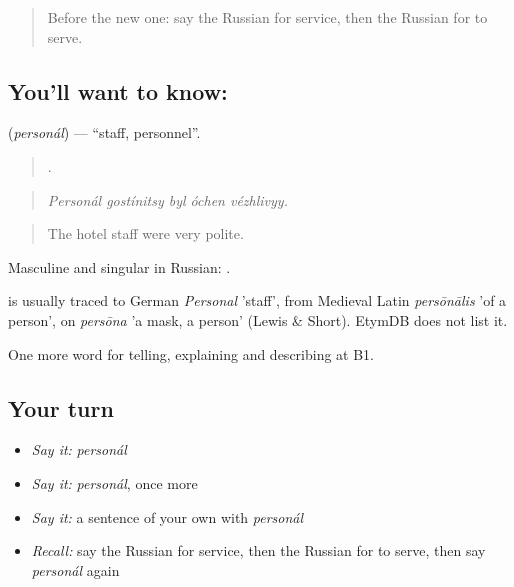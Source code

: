 \label{lesson:RU-C435-personal}



\begin{quote}
Before the new one: say the Russian for service, then the Russian for to serve.
\end{quote}

\subsection*{You'll want to know: }
\textbf{} (\emph{personál}) — \textquotedblleft{}staff, personnel\textquotedblright{}.

\begin{quote}
    .
\end{quote}

\begin{quote}
\emph{Personál gostínitsy byl óchen vézhlivyy.}
\end{quote}

\begin{quote}
The hotel staff were very polite.
\end{quote}

Masculine and singular in Russian: \emph{ }.

\begin{cousinweb}
\emph{} is usually traced to German \emph{Personal} 'staff', from Medieval Latin \emph{persōnālis} 'of a person', on \emph{persōna} 'a mask, a person' (Lewis \& Short). EtymDB does not list it.
\end{cousinweb}

\begin{grammarlens}[title={What you've built}]
One more word for telling, explaining and describing at B1.
\end{grammarlens}

\subsection*{Your turn}
\begin{itemize}
\raggedright
  \item \emph{Say it:} \emph{personál}
  \item \emph{Say it:} \emph{personál}, once more
  \item \emph{Say it:} a sentence of your own with \emph{personál}
  \item \emph{Recall:} say the Russian for service, then the Russian for to serve, then say \emph{personál} again
\end{itemize}

